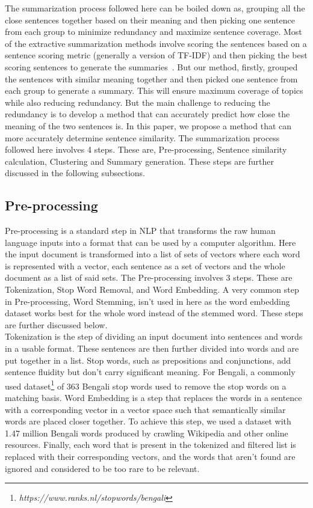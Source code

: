The summarization process followed here can be boiled down as, grouping all the close sentences together based on their meaning and then picking one sentence from each group to minimize redundancy and maximize sentence coverage. Most of the extractive summarization methods involve scoring the sentences based on a sentence scoring metric (generally a version of TF-IDF) and then picking the best scoring sentences to generate the summaries~\cite{Akter-2017-tfidf-3,das-2022-tfidf,sarkar-2012-tfidf,sarkar-2012-tfidf-2}. But our method, firstly, grouped the sentences with similar meaning together and then picked one sentence from each group to generate a summary. This will ensure maximum coverage of topics while also reducing redundancy. But the main challenge to reducing the redundancy is to develop a method that can accurately predict how close the meaning of the two sentences is. In this paper, we propose a method that can more accurately determine sentence similarity. The summarization process followed here involves 4 steps. These are, Pre-processing, Sentence similarity calculation, Clustering and Summary generation. These steps are further discussed in the following subsections.

\subsection{Pre-processing}\label{subsec:pre-processing}
Pre-processing is a standard step in NLP that transforms the raw human language inputs into a format that can be used by a computer algorithm. Here the input document is transformed into a list of sets of vectors where each word is represented with a vector, each sentence as a set of vectors and the whole document as a list of said sets. The Pre-processing involves 3 steps. These are Tokenization, Stop Word Removal, and Word Embedding. A very common step in Pre-processing, Word Stemming, isn't used in here as the word embedding dataset works best for the whole word instead of the stemmed word. These steps are further discussed below.\\

Tokenization is the step of dividing an input document into sentences and words in a usable format. These sentences are then further divided into words and are put together in a list. Stop words, such as prepositions and conjunctions, add sentence fluidity but don’t carry significant meaning. For Bengali, a commonly used dataset\footnote{\textit{https://www.ranks.nl/stopwords/bengali}} of 363 Bengali stop words used to remove the stop words on a matching basis. Word Embedding is a step that replaces the words in a sentence with a corresponding vector in a vector space such that semantically similar words are placed closer together. To achieve this step, we used a dataset with 1.47 million Bengali words produced by \citeauthor{grave-etal-2018-fasttext} \cite{grave-etal-2018-fasttext} crawling Wikipedia and other online resources. Finally, each word that is present in the tokenized and filtered list is replaced with their corresponding vectors, and the words that aren't found are ignored and considered to be too rare to be relevant.


